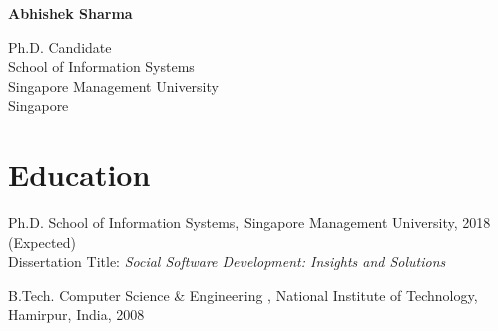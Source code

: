 \documentclass[12pt,letterpaper]{article}
\newcommand{\myname}{Abhishek Sharma}
\newcommand{\namefont}[1]{{\normalfont\bfseries\Huge{#1}}}
\begin{document}
\raggedright

\namefont{\myname}

\vspace{1em}
\begin{minipage}[t]{0.495\textwidth}
Ph.D. Candidate\\
  School of Information Systems\\
Singapore Management University \\
Singapore\\
\end{minipage}

\vspace{0.5em}



\section*{Education}

\begin{tablist}
	
\item[Ph.D.] \tab School of Information Systems, Singapore Management University, 2018 (Expected) \\
                  Dissertation Title: \textit{Social Software Development: Insights and Solutions} \\
                  
                 

\item[B.Tech.]  \tab Computer Science \& Engineering , National Institute of Technology,  Hamirpur, India, 2008

\end{tablist}
\end{document}
